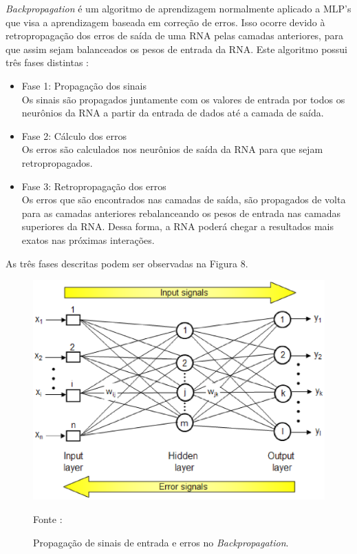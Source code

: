 \textit{Backpropagation} é um algoritmo de aprendizagem normalmente aplicado a MLP's que visa a aprendizagem baseada em correção de erros. Isso ocorre devido à retropropagação dos erros de saída de uma RNA pelas camadas anteriores, para que assim sejam balanceados os pesos de entrada da RNA.
Este algoritmo possui três fases distintas \cite{netto2006}:

\begin{itemize}
    \item Fase 1: Propagação dos sinais \\ Os sinais são propagados juntamente com os valores de entrada por todos os neurônios da RNA a partir da entrada de dados até a camada de saída.
    \item Fase 2: Cálculo dos erros \\ Os erros são calculados nos neurônios de saída da RNA para que sejam retropropagados.
    \item Fase 3: Retropropagação dos erros \\ Os erros que são encontrados nas camadas de saída, são propagados de volta para as camadas anteriores rebalanceando os pesos de entrada nas camadas superiores da RNA. Dessa forma, a RNA poderá chegar a resultados mais exatos nas próximas interações.
\end{itemize}

As três fases descritas podem ser observadas na Figura 8.

\begin{figure}[ht]
        \centering
        \label{fig08}
            \includegraphics[keepaspectratio=true, scale=0.4]{editaveis/images/backprop.eps}
        \caption{Propagação de sinais de entrada e erros no \textit{Backpropagation}.}
        Fonte : \cite{buranajun2007}
\end{figure}


